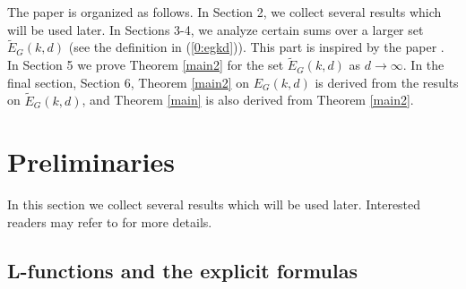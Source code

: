 \documentclass[12pt]{amsart}
\theoremstyle{plain}
\begin{document}
The paper is organized as follows. In Section 2, we collect several results which will be used later. In Sections 3-4, we analyze certain sums over a larger set $\widetilde{E}_G(k,d)$ (see the definition in (\ref{0:egkd})). This part is inspired by the paper \cite{woo}. In Section 5 we prove Theorem \ref{main2} for the set $\widetilde{E}_G(k,d)$ as $d \to \infty$. In the final section, Section 6, Theorem \ref{main2} on $E_G(k,d)$ is derived from the results on $\widetilde{E}_G(k,d)$, and Theorem \ref{main} is also derived from Theorem \ref{main2}.

\section{Preliminaries}

In this section we collect several results which will be used later. Interested readers may refer to \cite{ros} for more details.

\subsection{L-functions and the explicit formulas}
\end{document}
